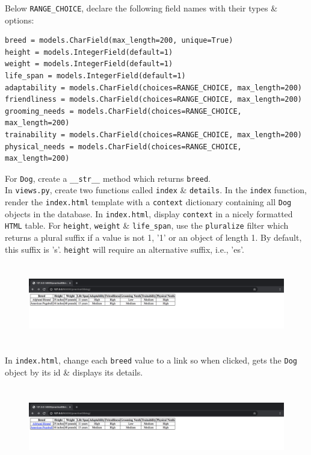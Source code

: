 \documentclass{article}
\begin{document}
Below \texttt{RANGE\_CHOICE}, declare the following field names with their types \& options: 
\begin{verbatim}
breed = models.CharField(max_length=200, unique=True) 
height = models.IntegerField(default=1) 
weight = models.IntegerField(default=1) 
life_span = models.IntegerField(default=1) 
adaptability = models.CharField(choices=RANGE_CHOICE, max_length=200) 
friendliness = models.CharField(choices=RANGE_CHOICE, max_length=200) 
grooming_needs = models.CharField(choices=RANGE_CHOICE, max_length=200) 
trainability = models.CharField(choices=RANGE_CHOICE, max_length=200) 
physical_needs = models.CharField(choices=RANGE_CHOICE, max_length=200) 
\end{verbatim}

For \texttt{Dog}, create a \texttt{\_\_str\_\_} method which returns \texttt{breed}. \\

In \texttt{views.py}, create two functions called \texttt{index} \& \texttt{details}. In the \texttt{index} function, render the \texttt{index.html} template with a \texttt{context} dictionary containing all \texttt{Dog} objects in the database. In \texttt{index.html}, display \texttt{context} in a nicely formatted \texttt{HTML} table. For \texttt{height}, \texttt{weight} \& \texttt{life\_span}, use the \texttt{pluralize} filter which returns a plural suffix if a value is not 1, '1' or an object of length 1. By default, this suffix is 's'. \texttt{height} will require an alternative suffix, i.e., 'es'. 

\begin{figure}[H]
  \includegraphics[width=175mm, height=35mm]{./img/08-expected-dog-1.png}
\end{figure}

In \texttt{index.html}, change each \texttt{breed} value to a link so when clicked, gets the \texttt{Dog} object by its id \& displays its details.

\begin{figure}[H]
  \includegraphics[width=175mm, height=35mm]{./img/08-expected-dog-2.png}
\end{figure} 
\end{document}
